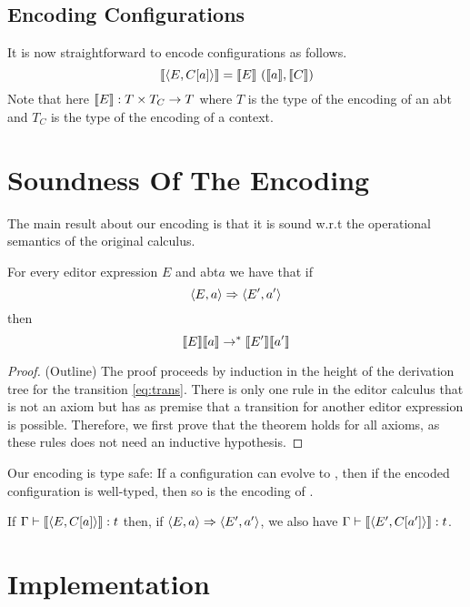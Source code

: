 \documentclass[sigplan]{acmart}
\newcommand{\abt}{\textsf{abt}\xspace}
\begin{document}
\subsection{Encoding Configurations}

It is now straightforward to encode configurations as follows.
%
\[ \llbracket \langle E, C[a] \rangle \rrbracket = \llbracket E \rrbracket \  (\llbracket a \rrbracket, \llbracket C \rrbracket) \]
%
Note that here $\llbracket E \rrbracket : T \times T_C \to T$ where $T$ is the type
of the encoding of an \abt and $T_C$ is the type of the encoding of a context.

\section{Soundness Of The Encoding} \label{sec:sound}

The main result about our encoding is that it is sound w.r.t the
operational semantics of the original calculus.

\begin{theorem}[Soundness] \label{thm:sound} For every editor
  expression $E$ and \abt $a$ we have that if
  \begin{equation} \langle E,a \rangle \stackrel{}{\Rightarrow} \langle E',a' \rangle \label{eq:trans} \end{equation}
  then
  \begin{equation} \llbracket E \rrbracket\llbracket a \rrbracket \rightarrow^{\ast}
    \llbracket E' \rrbracket\llbracket a' \rrbracket  \label{eq:ctrans} \end{equation}
\end{theorem}
\begin{proof}(Outline) The proof proceeds by induction in the height
  of the derivation tree for the transition \eqref{eq:trans}. There is
  only one rule in the editor calculus that is not an axiom but has as
  premise that a transition for another editor expression is
  possible. Therefore, we first prove that the theorem holds for all
  axioms, as these rules does not need an inductive hypothesis.
\end{proof}
Our encoding is type safe: If a configuration
 can evolve to , then if the encoded configuration
is well-typed, then so is the encoding of .

\begin{corollary}
  If $\Gamma \vdash \llbracket \langle E,C[a] \rangle \rrbracket : t$ then, if $\langle E,a \rangle
  \stackrel{}{\Rightarrow} \langle E',a' \rangle$, we also have $\Gamma \vdash \llbracket \langle E',C[a'] \rangle \rrbracket : t$.
\end{corollary}

\section{Implementation}
\end{document}
